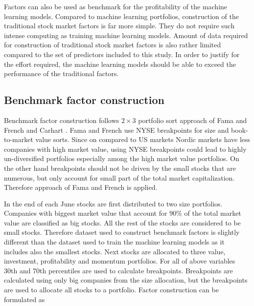 \documentclass{article}
\begin{document}
Factors can also be used as benchmark for the profitability of the machine learning models. Compared to machine learning portfolios, construction of the traditional stock market factors is far more simple. They do not require such intense computing as training machine learning models. Amount of data required for construction of traditional stock market factors is also rather limited compared to the set of predictors included to this study. In order to justify for the effort required, the machine learning models should be able to exceed the performance of the traditional factors.

\subsection{Benchmark factor construction}\label{BenchmarkFactorsConstruction}

Benchmark factor construction follows $2 \times 3$ portfolio sort approach of Fama and French \citeyear{FAMA19933, FAMA20151} and Carhart \citeyear{Carhart1997}. Fama and French \citeyear{FAMA19933} use NYSE breakpoints for size and book-to-market value sorts. Since on compared to US markets Nordic markets have less companies with high market value, using NYSE breakpoints could lead to highly un-diversified portfolios especially among the high market value portfolios. On the other hand breakpoints should not be driven by the small stocks that are numerous, but only account for small part of the total market capitalization. Therefore approach of Fama and French \citeyear{FAMA2012457} is applied.  \par

In the end of each June stocks are first distributed to two size portfolios. Companies with biggest market value that account for $90\%$ of the total market value are classified as big stocks. All the rest of the stocks are considered to be small stocks. Therefore dataset used to construct benchmark factors is slightly different than the dataset used to train the machine learning models as it includes also the smallest stocks. Next stocks are allocated to three value, investment, profitability and momentum portfolios. For all of above variables 30th and 70th percentiles are used to calculate breakpoints. Breakpoints are calculated using only big companies from the size allocation, but the breakpoints are used to allocate all stocks to a portfolio. Factor construction can be formulated as \par
\end{document}
